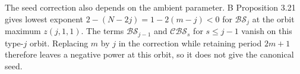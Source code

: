 The seed correction also depends on the ambient parameter. B Proposition 3.21 gives
lowest exponent \(2-(N-2j)=1-2(m-j)<0\) for \(\mathcal{BS}_j\) at the
orbit maximum \(z(j,1,1)\). The terms \(\mathcal{BS}_{j-1}\) and
\(\mathcal{CBS}_s\) for \(s\le j-1\) vanish on this type-\(j\) orbit.
Replacing \(m\) by \(j\) in the correction while retaining period \(2m+1\)
therefore leaves a negative power at this orbit, so it does not give the
canonical seed.
